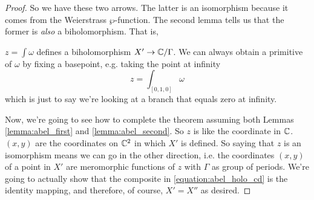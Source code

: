 \documentclass{article}
\begin{document}
\begin{proof}
So we have these two arrows. The latter is an isomorphism because it comes from the Weierstrass \(\wp\)-function. The second lemma tells us that the former is \textit{also} a biholomorphism. That is,
\begin{lemma}
\(z = \int\omega\) defines a biholomorphism \(X' \to \mathbb{C}/\Gamma\). We can always obtain a primitive of \(\omega\) by fixing a basepoint, e.g. taking the point at infinity
\begin{equation}
  z = \int_{[0, 1, 0]}\omega
\end{equation}
which is just to say we're looking at a branch that equals zero at infinity.
\label{lemma:abel_second}
\end{lemma}
Now, we're going to see how to complete the theorem assuming both Lemmas \ref{lemma:abel_first} and \ref{lemma:abel_second}. So \(z\) is like the coordinate in \(\mathbb{C}\). \((x, y)\) are the coordinates on \(\mathbb{C}^2\) in which \(X'\) is defined. So saying that \(z\) is an isomorphism means we can go in the other direction, i.e. the coordinates \((x, y)\) of a point in \(X'\) are meromorphic functions of \(z\) with \(\Gamma\) as group of periods.
We're going to actually show that the composite in \ref{equation:abel_holo_cd} is the identity mapping, and therefore, of course, \(X' = X''\) as desired.


\end{proof}
\end{document}
